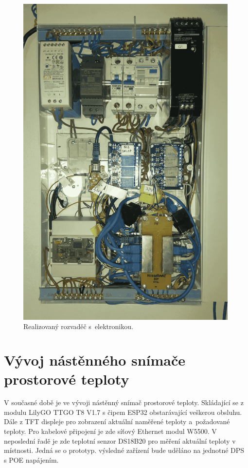 \newpage

\begin{figure}[H]
    \centering
    \includegraphics[width=0.99\textwidth]{images/rozvadec-ve-sklepe-s-elektronikou.png}
    \caption{Realizovaný rozvaděč s~elektronikou.}
    \label{fig:rozvadec-ve-sklepe-s-elektronikou}
\end{figure}


\section{Vývoj nástěnného snímače prostorové teploty}
V současné době je ve vývoji nástěnný snímač prostorové teploty. Skládající se z modulu LilyGO TTGO T8 V1.7 s čipem ESP32 obstarávající veškerou obsluhu. Dále z TFT displeje pro zobrazení aktuální naměřené teploty a~požadované teploty. Pro kabelové připojení je zde síťový Ethernet modul W5500. V neposlední řadě je zde teplotní senzor DS18B20 pro měření aktuální teploty v místnosti. Jedná se o prototyp. výsledné zařízení bude uděláno na jednotné DPS s POE napájením.

